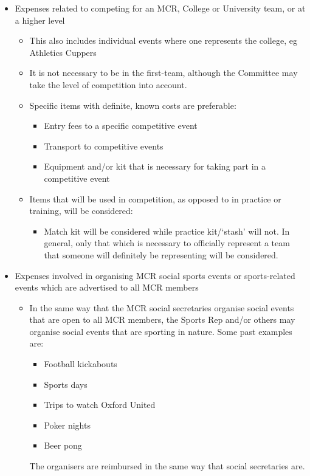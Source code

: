 \begin{itemize}
	\item Expenses related to competing for an MCR, College or University team, or at a higher level
	\begin{itemize}
		\item This also includes individual events where one represents the college, eg Athletics Cuppers
		\item It is not necessary to be in the first-team, although the Committee may take the level of competition into account.
		\item Specific items with definite, known costs are preferable:
		\begin{itemize}
			\item Entry fees to a specific competitive event
			\item Transport to competitive events
			\item Equipment and/or kit that is necessary for taking part in a competitive event\end{itemize}
		\item Items that will be used in competition, as opposed to in practice or training, will be considered:
		\begin{itemize}
			\item Match kit will be considered while practice kit/`stash' will not. In general, only that which is necessary to officially represent a team that someone will definitely be representing will be considered.
		\end{itemize}
	\end{itemize}
	\item Expenses involved in organising MCR social sports events or sports-related events which are advertised to all MCR members
	\begin{itemize}
		\item In the same way that the MCR social secretaries organise social events that are open to all MCR members, the Sports Rep and/or others may organise social events that are sporting in nature. Some past examples are:
		\begin{itemize}
			\item Football kickabouts
			\item Sports days
			\item Trips to watch Oxford United
			\item Poker nights
			\item Beer pong
		\end{itemize}
		The organisers are reimbursed in the same way that social secretaries are.

\end{itemize}
\end{itemize}
